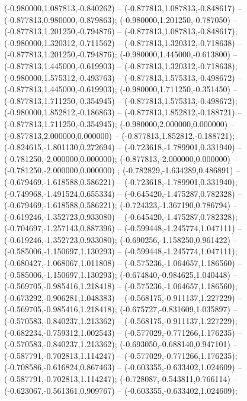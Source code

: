  (-0.980000,1.087813,-0.840262) -- (-0.877813,1.087813,-0.848617) -- (-0.877813,0.980000,-0.879863);
 (-0.980000,1.201250,-0.787050) -- (-0.877813,1.201250,-0.794876) -- (-0.877813,1.087813,-0.848617);
 (-0.980000,1.320312,-0.711562) -- (-0.877813,1.320312,-0.718638) -- (-0.877813,1.201250,-0.794876);
 (-0.980000,1.445000,-0.613800) -- (-0.877813,1.445000,-0.619903) -- (-0.877813,1.320312,-0.718638);
 (-0.980000,1.575312,-0.493763) -- (-0.877813,1.575313,-0.498672) -- (-0.877813,1.445000,-0.619903);
 (-0.980000,1.711250,-0.351450) -- (-0.877813,1.711250,-0.354945) -- (-0.877813,1.575313,-0.498672);
 (-0.980000,1.852812,-0.186863) -- (-0.877813,1.852812,-0.188721) -- (-0.877813,1.711250,-0.354945);
 (-0.980000,2.000000,0.000000) -- (-0.877813,2.000000,0.000000) -- (-0.877813,1.852812,-0.188721);
 (-0.824615,-1.801130,0.272694) -- (-0.723618,-1.789901,0.331940) -- (-0.781250,-2.000000,0.000000);
 (-0.877813,-2.000000,0.000000) -- (-0.781250,-2.000000,0.000000) ;
 (-0.782829,-1.634289,0.486891) -- (-0.679469,-1.618588,0.586221) -- (-0.723618,-1.789901,0.331940);
 (-0.749968,-1.491524,0.655334) -- (-0.645420,-1.475287,0.782328) -- (-0.679469,-1.618588,0.586221);
 (-0.724323,-1.367190,0.786794) -- (-0.619246,-1.352723,0.933080) -- (-0.645420,-1.475287,0.782328);
 (-0.704697,-1.257143,0.887396) -- (-0.599448,-1.245774,1.047111) -- (-0.619246,-1.352723,0.933080);
 (-0.690256,-1.158250,0.961422) -- (-0.585006,-1.150697,1.130293) -- (-0.599448,-1.245774,1.047111);
 (-0.680427,-1.068067,1.011808) -- (-0.575236,-1.064657,1.186560) -- (-0.585006,-1.150697,1.130293);
 (-0.674840,-0.984625,1.040448) -- (-0.569705,-0.985416,1.218418) -- (-0.575236,-1.064657,1.186560);
 (-0.673292,-0.906281,1.048383) -- (-0.568175,-0.911137,1.227229) -- (-0.569705,-0.985416,1.218418);
 (-0.675727,-0.831609,1.035897) -- (-0.570583,-0.840237,1.213362) -- (-0.568175,-0.911137,1.227229);
 (-0.682234,-0.759312,1.002543) -- (-0.577029,-0.771266,1.176235) -- (-0.570583,-0.840237,1.213362);
 (-0.693050,-0.688140,0.947101) -- (-0.587791,-0.702813,1.114247) -- (-0.577029,-0.771266,1.176235);
 (-0.708586,-0.616824,0.867463) -- (-0.603355,-0.633402,1.024609) -- (-0.587791,-0.702813,1.114247);
 (-0.728087,-0.543811,0.766114) -- (-0.623067,-0.561361,0.909767) -- (-0.603355,-0.633402,1.024609);
